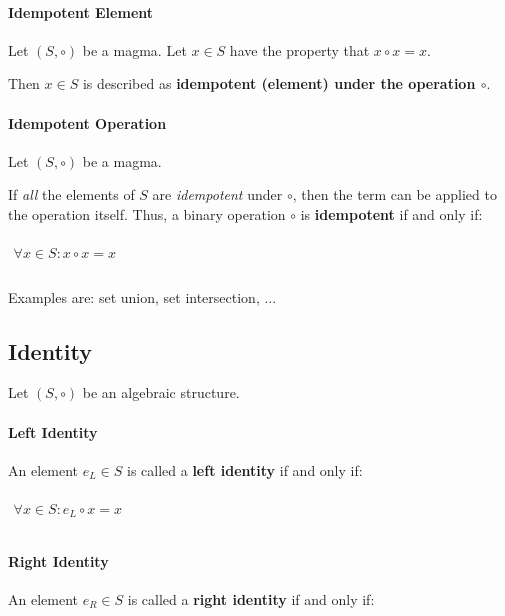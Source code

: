 \paragraph{Idempotent Element}
Let $(S, \circ)$ be a magma. Let $x \in S$ have the property that
$ x \circ x = x$.

Then $x \in S $ is described as \textbf{idempotent (element) under the
  operation $\circ$}.

\paragraph{Idempotent Operation}
Let $(S, \circ)$ be a magma.


If \textit{all} the elements of $S$ are \textit{idempotent} under
$\circ$, then the term can be applied to the operation itself. Thus, a
binary operation $\circ$ is \textbf{idempotent} if and only if:

\begin{math}
  \begin{array}{c}
    \\
    \forall x \in S: x \circ x = x\\
    \\
  \end{array}
\end{math}

Examples are: set union, set intersection, ...



\subsection{Identity}
\label{sec:identity}

Let $(S, \circ)$ be an algebraic structure.


\paragraph{Left Identity}
An element $e_L \in S$ is called a \textbf{left identity} if and only
if:

\begin{math}
  \begin{array}{c}
    \\
    \forall x \in S: e_L \circ x = x\\
    \\
  \end{array}
\end{math}

\paragraph{Right Identity}
An element $e_R \in S$ is called a \textbf{right identity} if and only
if:

